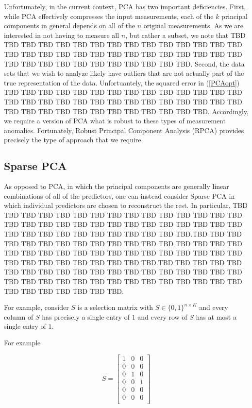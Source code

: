 \documentclass[conference]{IEEEtran}
\begin{document}
Unfortunately, in the current context, PCA has two important deficiencies.  First, while PCA effectively compresses the input measurements, each of the $k$ principal components in general depends on all of the $n$ original measurements.   As we are interested in not having to measure all $n$, but rather a subset, we note that TBD TBD TBD TBD TBD TBD TBD TBD TBD TBD TBD TBD TBD TBD TBD TBD TBD TBD TBD TBD TBD TBD TBD TBD TBD TBD TBD TBD TBD TBD TBD TBD TBD TBD TBD TBD TBD TBD TBD TBD.  Second, the data sets that we wish to analyze likely have outliers that are not actually part of the true representation of the data.  Unfortuantely, the squared error in (\ref{PCAopt}) TBD TBD TBD TBD TBD TBD TBD TBD TBD TBD TBD TBD TBD TBD TBD TBD TBD TBD TBD TBD TBD TBD TBD TBD TBD TBD TBD TBD TBD TBD TBD TBD TBD TBD TBD TBD TBD TBD TBD TBD.  Accordingly, we require a version of PCA what is robust to these types of measurement anomalies.   Fortunately, Robust Principal Component Analysis (RPCA) \cite{Candes2009,
 Candes2011, Chandrasekaran2009, Cai2010, Paffenroth2012a,Paffenroth2013b} provides precisely the type of approach that we require.   

\subsection{Sparse PCA}

As opposed to PCA, in which the principal components are generally linear combinations of all of the predictors, one can instead consider Sparse PCA \cite{htf01} in which individual predictors are chosen to reconstruct the rest.  In particular, TBD TBD TBD TBD TBD TBD TBD TBD TBD TBD TBD TBD TBD TBD TBD TBD TBD TBD TBD TBD TBD TBD TBD TBD TBD TBD TBD TBD TBD TBD TBD TBD TBD TBD TBD TBD TBD TBD TBD TBD.TBD TBD TBD TBD TBD TBD TBD TBD TBD TBD TBD TBD TBD TBD TBD TBD TBD TBD TBD TBD TBD TBD TBD TBD TBD TBD TBD TBD TBD TBD TBD TBD TBD TBD TBD TBD TBD TBD TBD TBD.TBD TBD TBD TBD TBD TBD TBD TBD TBD TBD TBD TBD TBD TBD TBD TBD TBD TBD TBD TBD TBD TBD TBD TBD TBD TBD TBD TBD TBD TBD TBD TBD TBD TBD TBD TBD TBD TBD TBD TBD.

For example, consider $S$ is a selection matrix with $S \in \{0,1\}^{n \times K}$ and every column of $S$ has precisely a single entry of $1$ and every row of $S$ has at most a single entry of $1$.

For example

$$
S = 
\begin{bmatrix}
1 & 0 & 0 \\
0 & 0 & 0 \\
0 & 1 & 0 \\
0 & 0 & 1 \\
0 & 0 & 0 \\
0 & 0 & 0 \\
\end{bmatrix}
$$
\end{document}
